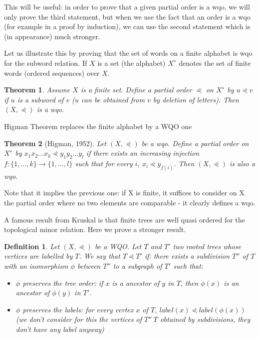 \documentclass[12pt,a4paper]{article}
\newtheorem{theorem}{Theorem}
\newtheorem{definition}{Definition}
\begin{document}
This will be useful: in order to prove that a given partial order is a wqo, we
will only prove the third statement, but when we use the fact that an order is a
wqo (for example in a proof by induction), we can use the second statement which
is (in appearance) much stronger.

Let us illustrate this by proving that the set of words on a finite alphabet is
wqo for the subword relation. If $X$ is a set (the alphabet) $X^∗$ denotes the
set of finite words (ordered sequences) over $X$.

\begin{theorem}
  Assume $X$ is a finite set. Define a partial order $\curlyeqprec$ on $X^∗$ by
  $u \curlyeqprec v$ if $u$ is a subword of $v$ ($u$ can be obtained from $v$ by
  deletion of letters). Then $( X, \curlyeqprec)$ is a wqo.
\end{theorem}

Higman Theorem replaces the finite alphabet by a WQO one
\begin{theorem}[Higman, 1952]
  Let $( X, \curlyeqprec)$ be a wqo. Define a partial order on $X^∗$ by
  $x_1 x_2 \dots x_k \curlyeqprec y_1 y_2 \dots y_l$ if there exists an
  increasing injection $f : \{ 1, \dots, k \} \to \{ 1, \dots, l \}$ such that
  for every $i$, $x_i \curlyeqprec y_{f ( i )}$. Then $( X, \curlyeqprec)$ is
  also a wqo.
\end{theorem}

Note that it implies the previous one: if X is finite, it suffices to consider
on X the partial order where no two elements are comparable - it clearly defines
a wqo.

A famous result from Kruskal is that finite trees are well quasi ordered for the
topological minor relation. Here we prove a stronger result.

\begin{definition}
  Let $( X, \curlyeqprec)$ be a WQO. Let $T$ and $T'$ two rooted trees whose
  vertices are labelled by $T$. We say that $T \curlyeqprec T'$ if: there
  exists a subdivision $T''$ of $T$ with an isomorphism $\phi$ between $T''$ to
  a subgraph of $T'$ such that:
\begin{itemize}
\item $\phi$ preserves the tree order: if $x$ is a ancestor of $y$ in $T$, then
  $\phi( x )$ is an ancestor of $\phi( y )$ in $T'$.
\item $\phi$ preserves the labels: for every vertex $x$ of $T$,
  $label( x ) \curlyeqprec label(\phi( x ))$ (we don't consider for this the
  vertices of $T''\ T$ obtained by subdivisions, they don't have any label
  anyway)
\end{itemize}
\end{definition}
\end{document}

